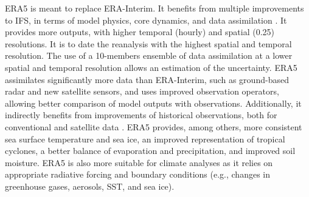 \documentclass[alpha-refs]{wiley-article}
\begin{document}
ERA5 \citep{Hersbach2019} is meant to replace ERA-Interim. It benefits from multiple improvements to IFS, in terms of model physics, core dynamics, and data assimilation \citep{Hersbach2019}. It provides more outputs, with higher temporal (hourly) and spatial (0.25\degree) resolutions. It is to date the reanalysis with the highest spatial and temporal resolution. The use of a 10-members ensemble of data assimilation at a lower spatial and temporal resolution allows an estimation of the uncertainty. ERA5 assimilates significantly more data than ERA-Interim, such as ground-based radar and new satellite sensors, and uses improved observation operators, allowing better comparison of model outputs with observations. Additionally, it indirectly benefits from improvements of historical observations, both for conventional and satellite data \citep{Hersbach2019}. ERA5 provides, among others, more consistent sea surface temperature and sea ice, an improved representation of tropical cyclones, a better balance of evaporation and precipitation, and improved soil moisture. ERA5 is also more suitable for climate analyses as it relies on appropriate radiative forcing and boundary conditions (e.g., changes in greenhouse gases, aerosols, SST, and sea ice).
\end{document}
